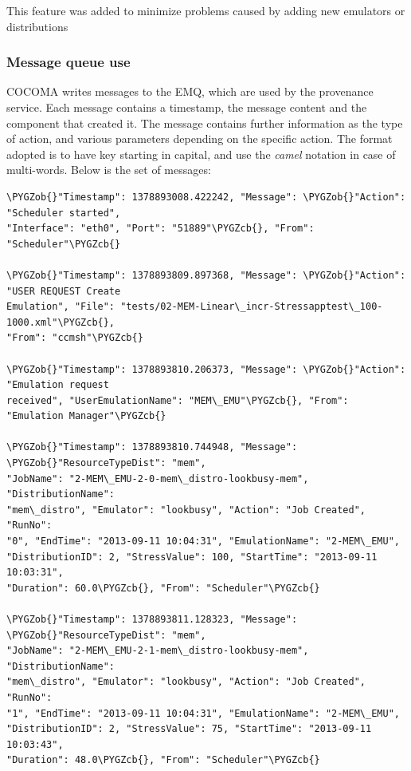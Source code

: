 \documentclass[letterpaper,10pt,english]{sphinxhowto}
\def\PYGZob{\char`\{}
\def\PYGZcb{\char`\}}
\begin{document}
This feature was added to minimize problems caused by adding new emulators or distributions


\subsubsection{Message queue use}
\label{COCOMA/06_additional_features:message-queue-use}
COCOMA writes messages to the EMQ, which are used by the provenance service. Each message contains a timestamp, the message content and the component that created it. The message contains further information as the type of action, and various parameters depending on the specific action. The format adopted is to have key starting in capital, and use the \emph{camel} notation in case of multi-words. Below is the set of messages:

\begin{Verbatim}[commandchars=\\\{\}]
\PYGZob{}"Timestamp": 1378893008.422242, "Message": \PYGZob{}"Action": "Scheduler started",
"Interface": "eth0", "Port": "51889"\PYGZcb{}, "From": "Scheduler"\PYGZcb{}

\PYGZob{}"Timestamp": 1378893809.897368, "Message": \PYGZob{}"Action": "USER REQUEST Create
Emulation", "File": "tests/02-MEM-Linear\_incr-Stressapptest\_100-1000.xml"\PYGZcb{},
"From": "ccmsh"\PYGZcb{}

\PYGZob{}"Timestamp": 1378893810.206373, "Message": \PYGZob{}"Action": "Emulation request
received", "UserEmulationName": "MEM\_EMU"\PYGZcb{}, "From": "Emulation Manager"\PYGZcb{}

\PYGZob{}"Timestamp": 1378893810.744948, "Message": \PYGZob{}"ResourceTypeDist": "mem",
"JobName": "2-MEM\_EMU-2-0-mem\_distro-lookbusy-mem", "DistributionName":
"mem\_distro", "Emulator": "lookbusy", "Action": "Job Created", "RunNo":
"0", "EndTime": "2013-09-11 10:04:31", "EmulationName": "2-MEM\_EMU",
"DistributionID": 2, "StressValue": 100, "StartTime": "2013-09-11 10:03:31",
"Duration": 60.0\PYGZcb{}, "From": "Scheduler"\PYGZcb{}

\PYGZob{}"Timestamp": 1378893811.128323, "Message": \PYGZob{}"ResourceTypeDist": "mem",
"JobName": "2-MEM\_EMU-2-1-mem\_distro-lookbusy-mem", "DistributionName":
"mem\_distro", "Emulator": "lookbusy", "Action": "Job Created", "RunNo":
"1", "EndTime": "2013-09-11 10:04:31", "EmulationName": "2-MEM\_EMU",
"DistributionID": 2, "StressValue": 75, "StartTime": "2013-09-11 10:03:43",
"Duration": 48.0\PYGZcb{}, "From": "Scheduler"\PYGZcb{}


\end{Verbatim}
\end{document}
